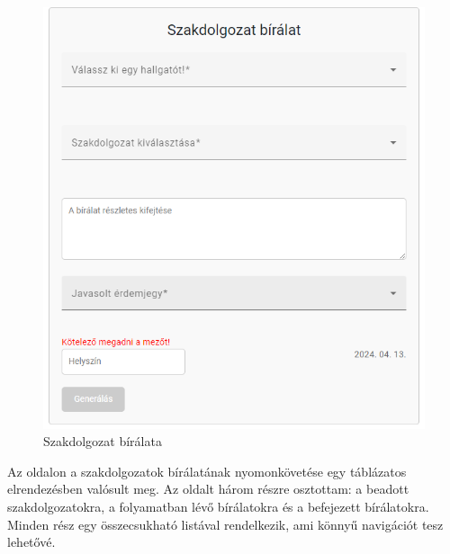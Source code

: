 \begin{figure}[h!]
\centering
\includegraphics[scale=0.5]{images/Review.png}
\caption{Szakdolgozat bírálata}
\label{fig:Review}
\end{figure}

\newpage


Az oldalon a szakdolgozatok bírálatának nyomonkövetése egy táblázatos elrendezésben valósult meg. Az oldalt három részre osztottam: a beadott szakdolgozatokra, a folyamatban lévő bírálatokra és a befejezett bírálatokra. Minden rész egy összecsukható listával rendelkezik, ami könnyű navigációt tesz lehetővé.

